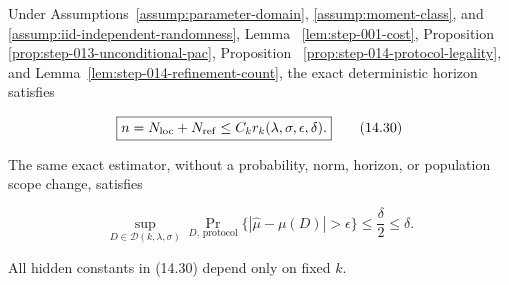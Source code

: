 \begin{proposition}\label{prop:step-014-rate-bridge}
Under Assumptions~\ref{assump:parameter-domain},
\ref{assump:moment-class}, and
\ref{assump:iid-independent-randomness}, Lemma~
\ref{lem:step-001-cost}, Proposition~
\ref{prop:step-013-unconditional-pac}, Proposition~
\ref{prop:step-014-protocol-legality}, and
Lemma~\ref{lem:step-014-refinement-count}, the exact deterministic
horizon satisfies

\[
\boxed{
n=N_{\rm loc}+N_{\rm ref}
\leq C_kr_k(\lambda,\sigma,\epsilon,\delta).
}
\tag{14.30}
\]

The same exact estimator, without a probability, norm, horizon, or population
scope change, satisfies

\[
\boxed{
\sup_{D\in\mathcal D(k,\lambda,\sigma)}
\Pr_{D,\,\mathrm{protocol}}
\{|\widehat\mu-\mu(D)|>\epsilon\}
\leq\frac\delta2\leq\delta.
}
\tag{14.31}
\]

All hidden constants in (14.30) depend only on fixed \(k\).
\end{proposition}

